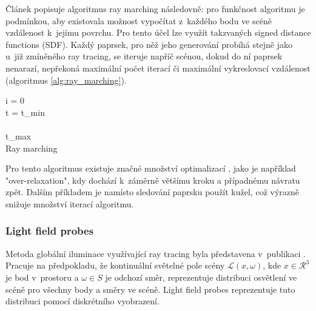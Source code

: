 Článek \cite{sphere_tracing} popisuje algoritmus ray marching následovně: pro funkčnost algoritmu je podmínkou, aby existovala možnost vypočítat z~každého bodu ve scéně vzdálenost k~jejímu povrchu. Pro tento účel lze využít takzvaných signed distance functions (SDF). Každý paprsek, pro něž jeho generování probíhá stejně jako u~již zmíněného ray tracing, se iteruje napříč scénou, dokud do ní paprsek nenarazí, nepřekoná maximální počet iterací či maximální vykreslovací vzdálenost (algoritmus \ref{alg:ray_marching}).


\begin{center}
	\begin{czechalgorithm}[H] \label{alg:ray_marching}
		i = 0\\
		t = t\_min\\
		\\
		\KwRet t\_max\\
		\caption{Ray marching}
	\end{czechalgorithm}
\end{center}

Pro tento algoritmus existuje značné množství optimalizací \cite{Keinert2014EnhancedST}, jako je například "over-relaxation", kdy dochází k~záměrně většímu kroku a případnému návratu zpět. Dalším příkladem je namísto sledování paprsku použít kužel, což výrazně snižuje množství iterací algoritmu.


\subsubsection{Light field probes} \label{sec:light_field_probes}
Metoda globální iluminace využívající ray tracing byla představena v~publikaci \cite{light_field_probes}. Pracuje na předpokladu, že kontinuální světelné pole scény $\mathcal{L}(x, \omega)$, kde $x \in \mathcal{R}^3$ je bod v~prostoru a $\omega \in S$ je odchozí směr, reprezentuje distribuci osvětlení ve scéně pro všechny body a směry ve scéně. Light field probes reprezentuje tuto distribuci pomocí diskrétního vyobrazení.


